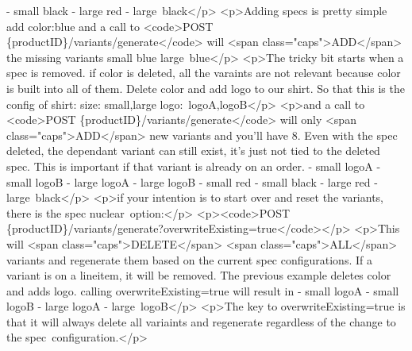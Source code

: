 \documentclass{memoir}%
\begin{document}
{-} small black\newline%
{-} large red\newline%
{-} large~black</p>\newline%
<p>Adding specs is pretty simple\newline%
add color:blue\newline%
and a call to \newline%
<code>POST \{productID\}/variants/generate</code>\newline%
will <span class="caps">ADD</span> the missing variants    small blue   large~blue</p>\newline%
<p>The tricky bit starts when a spec is removed. if color is deleted, all the varaints are not relevant because color is built into all of them. Delete color and add logo to our shirt. So that this is the config of shirt:\newline%
    size: small,large\newline%
    logo:~logoA,logoB</p>\newline%
<p>and a call to \newline%
<code>POST \{productID\}/variants/generate</code>\newline%
will only <span class="caps">ADD</span> new variants and you’ll have 8. Even with the spec deleted, the dependant variant can still exist, it’s just not tied to the deleted spec. This is important if that variant is already on an order.\newline%
{-} small logoA\newline%
{-} small logoB\newline%
{-} large logoA\newline%
{-} large logoB\newline%
{-} small red\newline%
{-} small black\newline%
{-} large red\newline%
{-} large~black</p>\newline%
<p>if your intention is to start over and reset the variants, there is the spec nuclear~option:</p>\newline%
<p><code>POST \{productID\}/variants/generate?overwriteExisting=true</code></p>\newline%
<p>This will <span class="caps">DELETE</span> <span class="caps">ALL</span> variants and regenerate them based on the current spec configurations. If a variant is on a lineitem, it will be removed. The previous example deletes color and adds logo. calling overwriteExisting=true will result in \newline%
{-} small logoA\newline%
{-} small logoB\newline%
{-} large logoA\newline%
{-} large~logoB</p>\newline%
<p>The key to overwriteExisting=true is that it will always delete all variaints and regenerate regardless of the change to the spec~configuration.</p>

%
\end{document}
